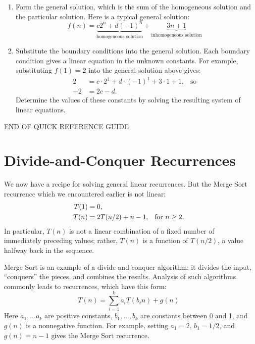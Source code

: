 \begin{enumerate}
\item Form the general solution, which is the sum of the homogeneous
  solution and the particular solution.  Here is a typical general
  solution:
\[
f(n) = \underbrace{c2^n + d(-1)^n}_{\text{homogeneous solution}} +
\underbrace{3n + 1}_{\text{inhomogeneous solution}}
\]
\item Substitute the boundary conditions into the general solution.
  Each boundary condition gives a linear equation in the unknown
  constants.  For example, substituting $f(1) = 2$ into the general
  solution above gives:
\begin{align*}
2 & = c\cdot2^1 + d \cdot(-1)^1 + 3 \cdot 1 + 1, & \text{so}\\
-2 & = 2c - d.
\end{align*}
Determine the values of these constants by solving the resulting
system of linear equations.
\end{enumerate}

\begin{center}
END OF QUICK REFERENCE GUIDE
\end{center}

\section{Divide-and-Conquer Recurrences}

We now have a recipe for solving general linear recurrences.  But the
Merge Sort recurrence which we encountered earlier is not linear:
\begin{align}
T(1) & = 0, \notag\\
T(n) & = 2 T(n/2) + n - 1, & \text{for $n \geq 2$}.\label{MS.2}
\end{align}
In particular, $T(n)$ is not a linear combination of a fixed number of
immediately preceding values; rather, $T(n)$ is a function of $T(n/2)$,
a value halfway back in the sequence.

Merge Sort is an example of a divide-and-conquer algorithm: it divides
the input, ``conquers'' the pieces, and combines the results.
Analysis of such algorithms commonly leads to 
recurrences, which have this form:
\begin{equation}\label{dandc_genl_eq}
T(n) =
 \sum_{i=1}^k a_i T(b_i n) + g(n)
\end{equation}
Here $a_1, \ldots a_k$ are positive constants, $b_1, \ldots, b_k$ are
constants between 0 and 1, and $g(n)$ is a nonnegative function.  For
example, setting $a_1 = 2$, $b_1 = 1/2$, and $g(n) = n - 1$ gives the
Merge Sort recurrence.

